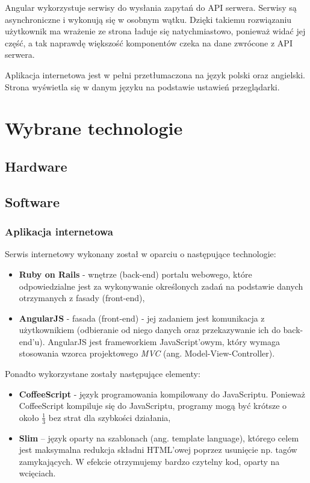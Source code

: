\documentclass[eng,oneside]{mgr}
\begin{document}
Angular wykorzystuje serwisy do wysłania zapytań do API serwera. Serwisy są asynchroniczne i wykonują się w osobnym wątku. Dzięki takiemu rozwiązaniu użytkownik ma wrażenie ze strona ładuje się natychmiastowo, ponieważ widać jej część, a tak naprawdę większość komponentów czeka na dane zwrócone z API serwera.

Aplikacja internetowa jest w pełni przetłumaczona na język polski oraz angielski. Strona wyświetla się w danym języku na podstawie ustawień przeglądarki.

\chapter{Wybrane technologie}
\section{Hardware}
\section{Software}
\subsection{Aplikacja internetowa}
Serwis internetowy wykonany został w oparciu o następujące technologie:
\begin{itemize}
	\item \textbf{Ruby on Rails} - wnętrze (back-end) portalu webowego, które odpowiedzialne jest za wykonywanie określonych zadań na podstawie danych otrzymanych z fasady (front-end),
	\item \textbf{AngularJS} - fasada (front-end) - jej zadaniem jest komunikacja z użytkownikiem (odbieranie od niego danych oraz przekazywanie ich do back-end'u). AngularJS jest frameworkiem JavaScript'owym, który wymaga stosowania wzorca projektowego \emph{MVC} (ang. Model-View-Controller).
\end{itemize}
Ponadto wykorzystane zostały następujące elementy:
\begin{itemize}
	\item \textbf{CoffeeScript} - język programowania kompilowany do JavaScriptu. Ponieważ CoffeeScript kompiluje się do JavaScriptu, programy mogą być krótsze o około $\frac{1}{3}$ bez strat dla szybkości działania,
	\item \textbf{Slim} – język oparty na szablonach (ang. template language), którego celem jest maksymalna redukcja składni HTML’owej poprzez usunięcie np. tagów zamykających. W efekcie otrzymujemy bardzo czytelny kod, oparty na wcięciach.
\end{itemize}
\end{document}
